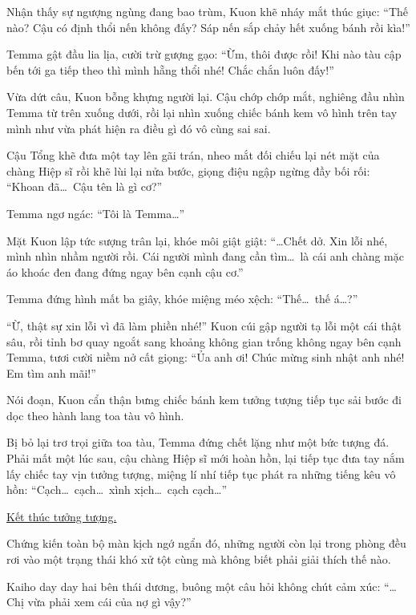 \documentclass[../main.tex]{subfiles}
\begin{document}
Nhận thấy sự ngượng ngùng đang bao trùm, Kuon khẽ nháy mắt thúc giục: ``Thế nào? Cậu có định thổi nến không đấy? Sáp nến sắp chảy hết xuống bánh rồi kìa!''

Temma gật đầu lia lịa, cười trừ gượng gạo: ``Ừm, thôi được rồi! Khi nào tàu cập bến tới ga tiếp theo thì mình hẵng thổi nhé! Chắc chắn luôn đấy!''

Vừa dứt câu, Kuon bỗng khựng người lại. Cậu chớp chớp mắt, nghiêng đầu nhìn Temma từ trên xuống dưới, rồi lại nhìn xuống chiếc bánh kem vô hình trên tay mình như vừa phát hiện ra điều gì đó vô cùng sai sai.

Cậu Tổng khẽ đưa một tay lên gãi trán, nheo mắt đối chiếu lại nét mặt của chàng Hiệp sĩ rồi khẽ lùi lại nửa bước, giọng điệu ngập ngừng đầy bối rối: ``Khoan đã\dots\ Cậu tên là gì cơ?''

Temma ngơ ngác: ``Tôi là Temma\dots''

Mặt Kuon lập tức sượng trân lại, khóe môi giật giật: ``\dots Chết dở. Xin lỗi nhé, mình nhìn nhầm người rồi. Cái người mình đang cần tìm\dots\ là cái anh chàng mặc áo khoác đen đang đứng ngay bên cạnh cậu cơ.''

Temma đứng hình mất ba giây, khóe miệng méo xệch: ``Thế\dots\ thế á\dots?''

``Ừ, thật sự xin lỗi vì đã làm phiền nhé!'' Kuon cúi gập người tạ lỗi một cái thật sâu, rồi tỉnh bơ quay ngoắt sang khoảng không gian trống không ngay bên cạnh Temma, tươi cười niềm nở cất giọng: ``Ủa anh ơi! Chúc mừng sinh nhật anh nhé! Em tìm anh mãi!''

Nói đoạn, Kuon cẩn thận bưng chiếc bánh kem tưởng tượng tiếp tục sải bước đi dọc theo hành lang toa tàu vô hình.

Bị bỏ lại trơ trọi giữa toa tàu, Temma đứng chết lặng như một bức tượng đá. Phải mất một lúc sau, cậu chàng Hiệp sĩ mới hoàn hồn, lại tiếp tục đưa tay nắm lấy chiếc tay vịn tưởng tượng, miệng lí nhí tiếp tục phát ra những tiếng kêu vô hồn: ``Cạch\dots\ cạch\dots\ xình xịch\dots\ cạch cạch\dots''

\begin{center}
  \uline{Kết thúc tưởng tượng.}
\end{center}

Chứng kiến toàn bộ màn kịch ngớ ngẩn đó, những người còn lại trong phòng đều rơi vào một trạng thái khó xử tột cùng mà không biết phải giải thích thế nào.


Kaiho day day hai bên thái dương, buông một câu hỏi không chút cảm xúc: ``\dots Chị vừa phải xem cái của nợ gì vậy?''
\end{document}
